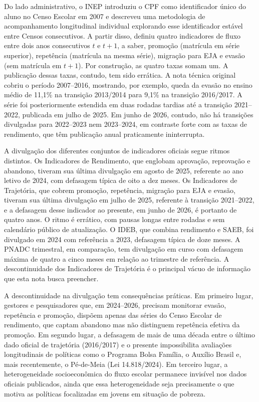 Do lado administrativo, o INEP \citep{INEP2017_fluxo} introduziu o
CPF como identificador único do aluno no Censo Escolar em 2007 e
descreveu uma metodologia de acompanhamento longitudinal individual
explorando esse identificador estável entre Censos consecutivos. A
partir disso, definiu quatro indicadores de fluxo entre dois anos
consecutivos $t$ e $t+1$, a saber, promoção (matrícula em série
superior), repetência (matrícula na mesma série), migração para
EJA e evasão (sem matrícula em $t+1$). Por construção, as quatro
taxas somam um. A publicação dessas taxas, contudo, tem sido
errática. A nota técnica original \citep{INEP_transicao} cobriu o
período 2007--2016, mostrando, por exemplo, queda da evasão no
ensino médio de 11,1\% na transição 2013/2014 para 9,1\% na
transição 2016/2017. A série foi posteriormente estendida em duas
rodadas tardias até a transição 2021--2022, publicada em julho de
2025. Em junho de 2026, contudo, não há transições divulgadas para
2022--2023 nem 2023--2024, em contraste forte com as taxas de
rendimento, que têm publicação anual praticamente ininterrupta.

A divulgação dos diferentes conjuntos de indicadores oficiais segue
ritmos distintos. Os Indicadores de Rendimento, que englobam
aprovação, reprovação e abandono, tiveram sua última divulgação em
agosto de 2025, referente ao ano letivo de 2024, com defasagem
típica de oito a dez meses. Os Indicadores de Trajetória, que cobrem
promoção, repetência, migração para EJA e evasão, tiveram sua
última divulgação em julho de 2025, referente à transição
2021--2022, e a defasagem desse indicador ao presente, em junho de
2026, é portanto de quatro anos. O ritmo é errático, com pausas
longas entre rodadas e sem calendário público de atualização. O
IDEB, que combina rendimento e SAEB, foi divulgado em 2024 com
referência a 2023, defasagem típica de doze meses. A PNADC
trimestral, em comparação, tem divulgação em curso com defasagem
máxima de quatro a cinco meses em relação ao trimestre de
referência. A descontinuidade dos Indicadores de Trajetória é o
principal vácuo de informação que esta nota busca preencher.

A descontinuidade na divulgação tem consequências práticas. Em
primeiro lugar, gestores e pesquisadores que, em 2024--2026,
precisam monitorar evasão, repetência e promoção, dispõem apenas
das séries do Censo Escolar de rendimento, que captam abandono mas
não distinguem repetência efetiva da promoção. Em segundo lugar, a
defasagem de mais de uma década entre o último dado oficial de
trajetória (2016/2017) e o presente impossibilita avaliações
longitudinais de políticas como o Programa Bolsa Família, o
Auxílio Brasil e, mais recentemente, o Pé-de-Meia
(Lei 14.818/2024). Em terceiro lugar, a heterogeneidade
socioeconômica do fluxo escolar permanece invisível nos dados
oficiais publicados, ainda que essa heterogeneidade seja
precisamente o que motiva as políticas focalizadas em jovens em
situação de pobreza.

